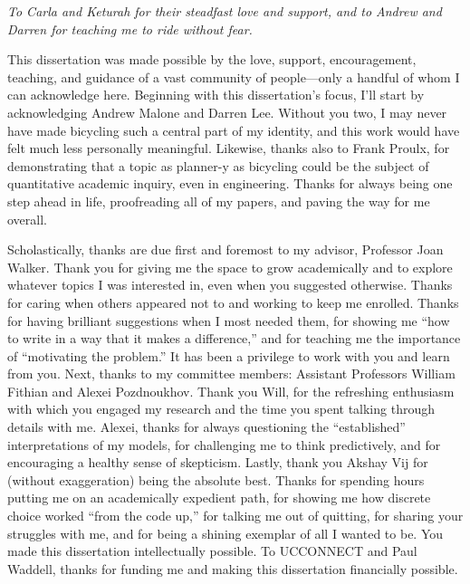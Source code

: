 \documentclass{ucbthesis}
\begin{document}
\begin{frontmatter}

\begin{dedication}
\null\vfil
\begin{center}
\textit{To Carla and Keturah for their steadfast love and support, \newline
and to Andrew and Darren for teaching me to ride without fear.}

\end{center}
\vfil\null
\end{dedication}


\tableofcontents
\clearpage
\listoffigures
\clearpage
\listoftables

\begin{acknowledgements}
This dissertation was made possible by the love, support, encouragement, teaching, and guidance of a vast community of people---only a handful of whom  I can acknowledge here. Beginning with this dissertation's focus, I'll start by acknowledging Andrew Malone and Darren Lee. Without you two, I may never have made bicycling such a central part of my identity, and this work would have felt much less personally meaningful. Likewise, thanks also to Frank Proulx, for demonstrating that a topic as planner-y as bicycling could be the subject of quantitative academic inquiry, even in engineering. Thanks for always being one step ahead in life, proofreading all of my papers, and paving the way for me overall.

Scholastically, thanks are due first and foremost to my advisor, Professor Joan Walker. Thank you for giving me the space to grow academically and to explore whatever topics I was interested in, even when you suggested otherwise. Thanks for caring when others appeared not to and working to keep me enrolled. Thanks for having brilliant suggestions when I most needed them, for showing me ``how to write in a way that it makes a difference,'' and for teaching me the importance of ``motivating the problem.'' It has been a privilege to work with you and learn from you. Next, thanks to my committee members:  Assistant Professors William Fithian and Alexei Pozdnoukhov. Thank you Will, for the refreshing enthusiasm with which you engaged my research and the time you spent talking through details with me. Alexei, thanks for always questioning the ``established'' interpretations of my models, for challenging me to think predictively, and for encouraging a healthy sense of skepticism. Lastly, thank you Akshay Vij for (without exaggeration) being the absolute best. Thanks for spending hours putting me on an academically expedient path, for showing me how discrete choice worked ``from the code up,'' for talking me out of quitting, for sharing your struggles with me, and for being a shining exemplar of all I wanted to be. You made this dissertation intellectually possible. To UCCONNECT and Paul Waddell, thanks for funding me and making this dissertation financially possible.


\end{acknowledgements}
\end{frontmatter}
\end{document}

